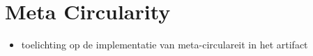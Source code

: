 \section{Meta Circularity} \label{sec:artifact_meta_Circularity}

\begin{itemize}
    \item toelichting op de implementatie van meta-circulareit in het artifact
\end{itemize}